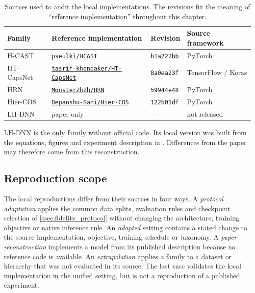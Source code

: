 \begin{table}[htbp]
\centering
\caption{Sources used to audit the local implementations. The revisions fix the
meaning of ``reference implementation'' throughout this chapter.}
\label{tab:fidelity_anchors}
\experimenttablesetup
\begin{tabularx}{\linewidth}{@{}L{2.4cm}YL{2.1cm}L{2.8cm}@{}}
\toprule
\textbf{Family} & \textbf{Reference implementation} & \textbf{Revision} & \textbf{Source framework} \\
\midrule
H-CAST     & \href{https://github.com/pseulki/HCAST}{\texttt{pseulki/HCAST}} & \texttt{b1a222bb} & PyTorch \\
HT-CapsNet & \href{https://github.com/tasrif-khondaker/HT-CapsNet}{\texttt{tasrif-khondaker/HT-CapsNet}} & \texttt{8a0ea23f} & TensorFlow / Keras \\
HRN        & \href{https://github.com/MonsterZhZh/HRN}{\texttt{MonsterZhZh/HRN}} & \texttt{59944e48} & PyTorch \\
Hier-COS   & \href{https://github.com/Depanshu-Sani/Hier-COS}{\texttt{Depanshu-Sani/Hier-COS}} & \texttt{122b01df} & PyTorch \\
LH-DNN     & paper only \cite{fiaschi2024informed} & --- & not released \\
\bottomrule
\end{tabularx}
\end{table}

LH-DNN is the only family without official code. Its local version was built
from the equations, figures and experiment description in
\cite{fiaschi2024informed}. Differences from the paper may therefore come from
this reconstruction.

\subsection{Reproduction scope}
\label{ssec:fidelity_classes}
\label{ssec:fidelity_families}

The local reproductions differ from their sources in four ways. A
\emph{protocol adaptation} applies the common data splits, evaluation rules
and checkpoint selection of \cref{ssec:fidelity_protocol} without changing the
architecture, training objective or native inference rule. An \emph{adapted}
setting contains a stated change to the source implementation, objective,
training schedule or taxonomy. A \emph{paper reconstruction} implements a
model from its published description because no reference code is available.
An \emph{extrapolation}
applies a family to a dataset or hierarchy that was not evaluated in its
source. The last case validates the local implementation in the unified
setting, but is not a reproduction of a published experiment.

